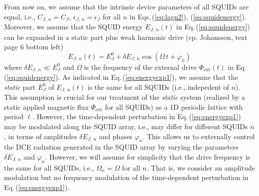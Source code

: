 From now on, we assume that the intrinsic device parameters of all SQUIDs are equal, i.e., 
$C_{J,\,n} = C_J$, $\epsilon_{J,\,n} = \epsilon_J$ for all $n$ in Eqs.\,(\ref{eq:lagn2}), (\ref{eq:squidenergy}).  
Moreover, we assume that the SQUID energy $E_{J,\,n}(t)$ in Eq.\,(\ref{eq:squidenergy}) 
can be expanded in a static part plus weak harmonic drive 
(cp. Johansson, text page 6 bottom left)
%
\begin{equation} \label{eq:energyexp1}
E_{J,\,n}(t) = E_J^0 + \delta E_{J,\,n} \cos(\Omega \, t + \varphi_n) 
\end{equation}
%
where $\delta E_{J,\,n} \ll E_J^0$ and $\Omega$ is the frequency of the external drive 
$\Phi_{\text{ext}}(t)$ in Eq.\,(\ref{eq:squidenergy}).
As indicated in Eq.\,(\ref{eq:energyexp1}), we assume that the {\em static} part 
$E_J^0$ of $E_{J,\,n}(t)$ is the same for all SQUIDs (i.e., indepedent of $n$). 
This assumption is crucial for our 
treatment of the {\em static} system (realized by a static applied magnetic flux $\Phi_{\text{ext}}$
for all SQUIDs) as a 1D periodic lattice with period $\ell$. However, the 
time-dependent perturbation in Eq.\,(\ref{eq:energyexp1})
may be modulated along the SQUID array, i.e., may differ for different SQUIDs $n$,
in terms of amplitudes $\delta E_{J,\,n}$ and phases $\varphi_n$.
This allows us to externally control the DCE radiation generated in the SQUID array
by varying the parameters $\delta E_{J,\,n}$ and $\varphi_n$.
However, we will assume for simplicity that the drive frequency 
is the same for all SQUIDs, i.e., $\Omega_n = \Omega$ for all $n$.
That is, we consider an amplitude modulation but no frequency modulation of the 
time-dependent perturbation in Eq.\,(\ref{eq:energyexp1}). 
%
%
%
%
%

